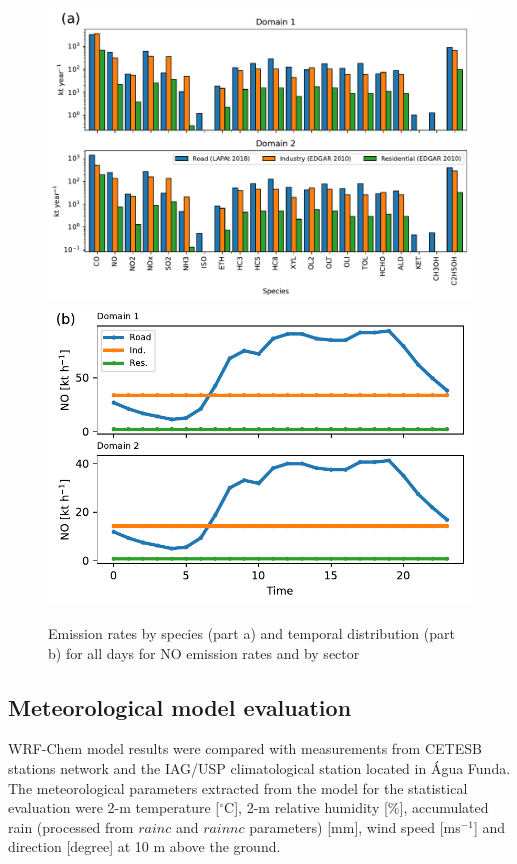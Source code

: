 	\begin{figure}[htpb]
		\centering
		\includegraphics[width=.8\textwidth]{fig/emi_kt.pdf}
		\includegraphics[width=.8\textwidth]{fig/emi_NO_time_kt.pdf}
  		\caption{Emission rates by species (part a) and temporal distribution (part b) for all days for NO emission rates and by sector}	
  		\label{fig:emiss_temp}
	\end{figure}
	
	
	
  \subsection{Meteorological model evaluation}\label{subsec:res_met}
  WRF-Chem model results were compared with measurements from CETESB stations network and the IAG/USP climatological station located in Água Funda.
The meteorological parameters extracted from the model for the statistical evaluation were 2-m temperature [$^\circ$C], 2-m relative humidity [\%], accumulated rain (processed from $rainc$ and $rainnc$ parameters) [mm], wind speed [ms$^{-1}$] and direction [degree] at 10 m above the ground.

